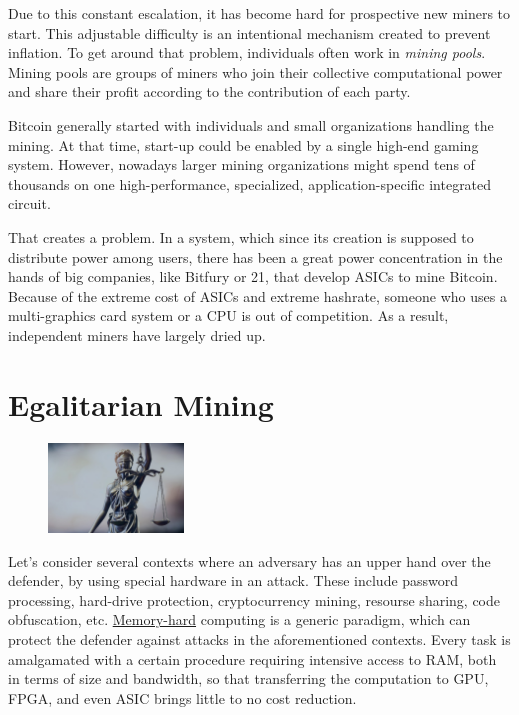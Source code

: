 Due to this constant escalation, it has become hard for prospective new miners to start. This adjustable difficulty is an intentional mechanism created to prevent inflation. To get around that problem, individuals often work in \emph{mining pools}. Mining pools are groups of miners who join their collective computational power and share their profit according to the contribution of each party.

Bitcoin generally started with individuals and small organizations handling the mining. At that time, start-up could be enabled by a single high-end gaming system. However, nowadays larger mining organizations might spend tens of thousands on one high-performance, specialized, application-specific integrated circuit.

That creates a problem. In a system, which since its creation is supposed to distribute power among users, there has been a great power concentration in the hands of big companies, like Bitfury or 21, that develop ASICs to mine Bitcoin. Because of the extreme cost of ASICs and extreme hashrate, someone who uses a multi-graphics card system or a CPU is out of competition. As a result, independent miners have largely dried up.

\section{Egalitarian Mining} \label{sec:egalitarian}
\setlength{\intextsep}{0pt}
\begin{figure}
\centering
\includegraphics[width=0.32\textwidth]{Images/Mining/justice.jpg}
\end{figure}
Let's consider several contexts where an adversary has an upper hand over the defender, by using special hardware in an attack. These include password processing, hard-drive protection, cryptocurrency mining, resourse sharing, code obfuscation, etc. \hyperref[sec:memory-hard]{Memory-hard} computing is a generic paradigm, which can protect the defender against attacks in the aforementioned contexts. Every task is amalgamated with a certain procedure requiring intensive access to RAM, both in terms of size and bandwidth, so that transferring the computation to GPU, FPGA, and even ASIC brings little to no cost reduction.

